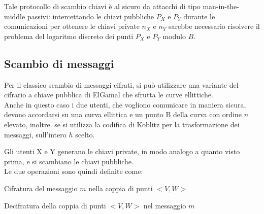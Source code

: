 \documentclass{article}
\begin{document}
	Tale protocollo di scambio chiavi è al sicuro da attacchi di tipo man-in-the-middle passivi:
	intercettando le chiavi pubbliche $P_{X}$ e $P_{Y}$ durante le comunicazioni
	per ottenere le chiavi private $n_{X}$ e $n_{Y}$ sarebbe necessario risolvere il problema del logaritmo discreto dei punti $P_{X}$ e $P_{Y}$ modulo $B$.
	
	\clearpage
	\subsection{Scambio di messaggi}
	
	Per il classico scambio di messaggi cifrati, si può utilizzare una variante del cifrario a chiave pubblica di ElGamal che sfrutta le curve ellittiche.\\
	
	Anche in questo caso i due utenti, che vogliono comunicare in maniera sicura, devono accordarsi su una curva ellittica e un punto B della curva con ordine $n$ elevato, inoltre. se si utilizza la codifica di Koblitz per la trasformazione dei messaggi, sull'intero $h$ scelto.
	
	Gli utenti X e Y generano le chiavi private, in modo analogo a quanto visto prima,
	e si scambiano le chiavi pubbliche.\\
	
	Le due operazioni sono quindi definite come:
	
	\begin{algorithm}[H]
		\caption{Cifratura del messaggio $m$ nella coppia di punti $<V, W>$ }
		\begin{algorithmic}[1]
			\Statex
			\State {}
			\EndFunction
		\end{algorithmic}
	\end{algorithm}
	
	\begin{algorithm}[H]
		\caption{Decifratura della coppia di punti $<V, W>$ nel messaggio $m$ }
		\begin{algorithmic}[1]
			\Statex
			\State {}
			\EndFunction
		\end{algorithmic}
	\end{algorithm}
	
\end{document}
